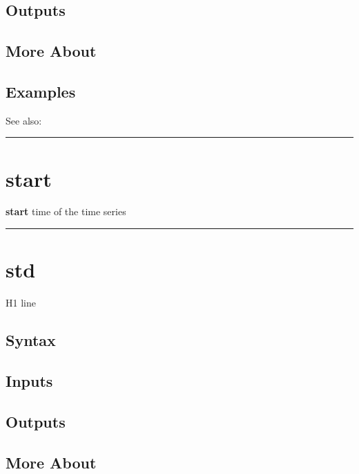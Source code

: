 \documentclass[letterpaper,10pt,english]{sphinxmanual}
\begin{document}
\subsection{Outputs}
\label{classes/time_series/@ts/ts:id532}

\subsection{More About}
\label{classes/time_series/@ts/ts:id533}

\subsection{Examples}
\label{classes/time_series/@ts/ts:id534}
See also:


\bigskip\hrule{}\bigskip



\section{start}
\label{classes/time_series/@ts/ts:start}\label{classes/time_series/@ts/ts:id535}
\textbf{start} time of the time series


\bigskip\hrule{}\bigskip



\section{std}
\label{classes/time_series/@ts/ts:std}\label{classes/time_series/@ts/ts:id536}
H1 line


\subsection{Syntax}
\label{classes/time_series/@ts/ts:id537}

\subsection{Inputs}
\label{classes/time_series/@ts/ts:id538}

\subsection{Outputs}
\label{classes/time_series/@ts/ts:id539}

\subsection{More About}
\label{classes/time_series/@ts/ts:id540}
\end{document}
